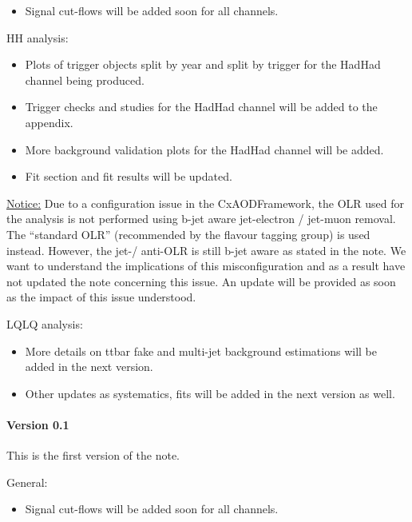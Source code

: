 \begin{itemize}
\item Signal cut-flows will be added soon for all channels.
\end{itemize}

HH analysis:

\begin{itemize}
\item Plots of trigger objects split by year and split by trigger for the HadHad channel being produced.
\item Trigger checks and studies for the HadHad channel will be added to the appendix.
\item More background validation plots for the HadHad channel will be added.
\item Fit section and fit results will be updated.
\end{itemize}

\underline{Notice:} Due to a configuration issue in the
CxAODFramework, the OLR used for the analysis is not performed using
b-jet aware jet-electron / jet-muon removal. The ``standard OLR''
(recommended by the flavour tagging group) is used instead. However,
the jet-\tauhad / anti-\tauhad OLR is still b-jet aware as stated in
the note. We want to understand the implications of this
misconfiguration and as a result have not updated the note concerning
this issue. An update will be provided as soon as the impact of this
issue understood.

LQLQ analysis:

\begin{itemize}
\item More details on ttbar fake and multi-jet background estimations will be added in the next version.
\item Other updates as systematics, fits will be added in the next version as well.
\end{itemize}


\paragraph*{Version 0.1}

This is the first version of the note.

General:

\begin{itemize}
\item Signal cut-flows will be added soon for all channels.
\end{itemize}

